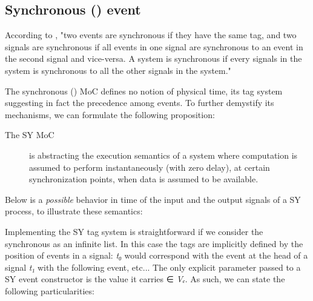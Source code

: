 \subsection{Synchronous () event}
According to \cite{Lee98}, "two events
 are synchronous if they have the same tag, and two signals are
 synchronous if all events in one signal are synchronous to an
 event in the second signal and vice-versa. A system is
 synchronous if every signals in the system is synchronous to all
 the other signals in the system."\par
The synchronous () MoC defines no notion of physical time,
 its tag system suggesting in fact the precedence among events. To
 further demystify its mechanisms, we can formulate the following
 proposition:\par
\begin{description}
\item[The SY MoC] is abstracting the execution semantics of a system
 where computation is assumed to perform instantaneously (with
 zero delay), at certain synchronization points, when data is
 assumed to be available.
\end{description}Below is a \emph{possible} behavior in time of the input and the
 output signals of a SY process, to illustrate these semantics:\par
                 \par
                 Implementing the SY tag system is straightforward if we consider
 the synchronous  as an infinite list. In this case the
 tags are implicitly defined by the position of events in a
 signal: \emph{t₀} would correspond with the event at the head of
 a signal \emph{t₁} with the following event, etc... The only
 explicit parameter passed to a SY event constructor is the value
 it carries ∈ \emph{Vₑ}. As such, we can state the
 following particularities:\par
